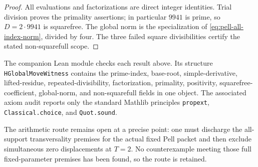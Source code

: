 \begin{proof}
All evaluations and factorizations are direct integer identities.  Trial
division proves the primality assertions; in particular $9941$ is prime,
so $D=2\cdot9941$ is squarefree.  The global norm is the specialization of
\eqref{eq:pell-all-index-norm}, divided by four.  The three failed square
divisibilities certify the stated non-squarefull scope.
\end{proof}

The companion Lean module checks each result above.  Its structure
\texttt{HGlobalMoveWitness} contains the prime-index,
base-root, simple-derivative, lifted-residue, repeated-divisibility,
factorization, primality, positivity, squarefree-coefficient, global-norm,
and non-squarefull fields in one object.  The associated axiom audit reports
only the standard Mathlib principles \texttt{propext},
\texttt{Classical.choice}, and \texttt{Quot.sound}.

The arithmetic route remains open at a precise point: one must discharge the
all-support transversality premises for the actual fixed Pell packet and then
exclude simultaneous zero displacements at $T=2$.  No counterexample meeting
those full fixed-parameter premises has been found, so the route is retained.
